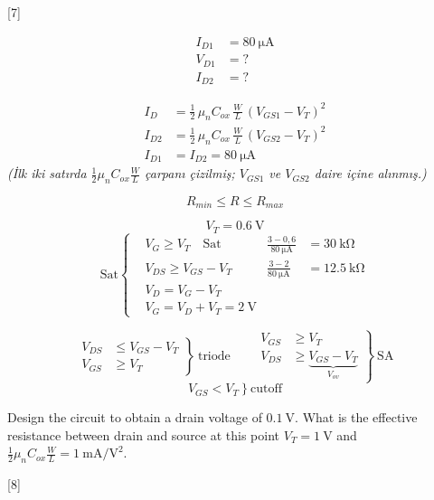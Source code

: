 \documentclass[11pt,a4paper]{article}
\begin{document}
[7]

\begin{align*}
  I_{D1} &= \qty{80}{\micro\ampere} \\
  V_{D1} &= ? \\
  I_{D2} &= ?
\end{align*}

\begin{align*}
  I_D &= \tfrac{1}{2}\,\mu_n C_{ox}\,\frac{W}{L}\,(V_{GS1}-V_T)^2 \\
  I_{D2} &= \tfrac{1}{2}\,\mu_n C_{ox}\,\frac{W}{L}\,(V_{GS2}-V_T)^2 \\
  I_{D1} &= I_{D2} = \qty{80}{\micro\ampere}
\end{align*}
\textit{(İlk iki satırda $\tfrac{1}{2}\mu_n C_{ox}\tfrac{W}{L}$ çarpanı çizilmiş; $V_{GS1}$ ve $V_{GS2}$ daire içine alınmış.)}

\[ R_{min} \le R \le R_{max} \]

\[ V_T = \qty{0,6}{\volt} \]
\[
\text{Sat} \left\{ \begin{aligned}
  & V_G \ge V_T \quad \text{Sat} & \frac{3-0{,}6}{\qty{80}{\micro\ampere}} &= \qty{30}{\kilo\ohm} \\
  & V_{DS} \ge V_{GS} - V_T & \frac{3-2}{\qty{80}{\micro\ampere}} &= \qty{12,5}{\kilo\ohm} \\
  & V_D = V_G - V_T & & \\
  & V_G = V_D + V_T = \qty{2}{\volt} & &
\end{aligned} \right.
\]

\[
\left.\begin{aligned} V_{DS} &\le V_{GS}-V_T \\ V_{GS} &\ge V_T \end{aligned}\right\}\ \text{triode}
\qquad
\left.\begin{aligned} V_{GS} &\ge V_T \\ V_{DS} &\ge \underbrace{V_{GS}-V_T}_{V_{ov}} \end{aligned}\right\}\ \text{SA}
\]
\[ V_{GS} < V_T \ \}\ \text{cutoff} \]

\begin{ornek}
  Design the circuit to obtain a drain voltage of $\qty{0,1}{\volt}$. What is the effective resistance between drain and source at this point $V_T = \qty{1}{\volt}$ and $\tfrac{1}{2}\mu_n C_{ox}\tfrac{W}{L} = \qty{1}{\milli\ampere\per\volt\squared}$.
\end{ornek}

[8]
\end{document}
